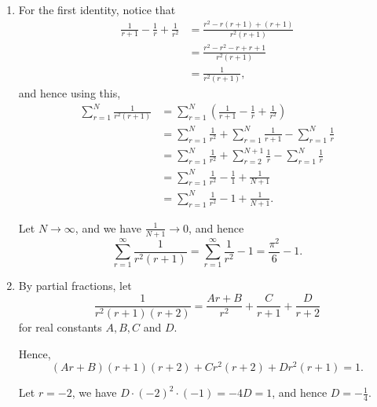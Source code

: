 \Question{\currfilebase}

\begin{enumerate}
    \item For the first identity, notice that
          \begin{align*}
              \frac{1}{r + 1} - \frac{1}{r} + \frac{1}{r^2} & = \frac{r^2 - r(r + 1) + (r + 1)}{r^2 (r + 1)} \\
                                                            & = \frac{r^2 - r^2 - r + r + 1}{r^2 (r + 1)}    \\
                                                            & = \frac{1}{r^2 (r + 1)},
          \end{align*}
          and hence using this,
          \begin{align*}
              \sum_{r = 1}^{N} \frac{1}{r^2 (r + 1)} & = \sum_{r = 1}^{N} \left(\frac{1}{r + 1} - \frac{1}{r} + \frac{1}{r^2}\right)                      \\
                                                     & = \sum_{r = 1}^{N} \frac{1}{r^2} + \sum_{r = 1}^{N} \frac{1}{r + 1} - \sum_{r = 1}^{N} \frac{1}{r} \\
                                                     & = \sum_{r = 1}^{N} \frac{1}{r^2} + \sum_{r = 2}^{N + 1} \frac{1}{r} - \sum_{r = 1}^{N} \frac{1}{r} \\
                                                     & = \sum_{r = 1}^{N} \frac{1}{r^2} - \frac{1}{1} + \frac{1}{N + 1}                                   \\
                                                     & = \sum_{r = 1}^{N} \frac{1}{r^2} - 1 + \frac{1}{N + 1}.
          \end{align*}

          Let \(N \to \infty\), and we have \(\frac{1}{N + 1} \to 0\), and hence
          \[
              \sum_{r = 1}^{\infty} \frac{1}{r^2 (r + 1)} = \sum_{r = 1}^{\infty} \frac{1}{r^2} - 1 = \frac{\pi^2}{6} - 1.
          \]

    \item By partial fractions, let
          \[
              \frac{1}{r^2 (r + 1) (r + 2)} = \frac{Ar + B}{r^2} + \frac{C}{r + 1} + \frac{D}{r + 2}
          \]
          for real constants \(A, B, C\) and \(D\).

          Hence,
          \[
              (Ar + B) (r + 1) (r + 2) + C r^2 (r + 2) + D r^2 (r + 1) = 1.
          \]

          Let \(r = -2\), we have \(D \cdot (-2)^2 \cdot (-1) = -4D = 1\), and hence \(D = - \frac{1}{4}\).


\end{enumerate}
